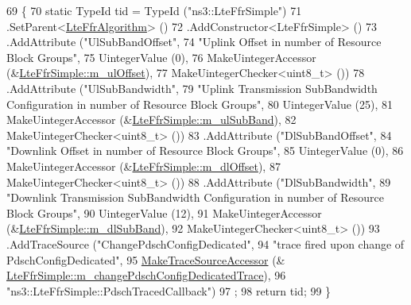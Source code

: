 \begin{DoxyCode}
69 \{
70   \textcolor{keyword}{static} TypeId tid = TypeId (\textcolor{stringliteral}{"ns3::LteFfrSimple"})
71     .SetParent<\hyperlink{classns3_1_1LteFfrAlgorithm_a1cfb2b0c9339553d90bf3eee7b66b25f}{LteFfrAlgorithm}> ()
72     .AddConstructor<LteFfrSimple> ()
73     .AddAttribute (\textcolor{stringliteral}{"UlSubBandOffset"},
74                    \textcolor{stringliteral}{"Uplink Offset in number of Resource Block Groups"},
75                    UintegerValue (0),
76                    MakeUintegerAccessor (&\hyperlink{classns3_1_1LteFfrSimple_aecad2931c0699de2c4df244e937dbea5}{LteFfrSimple::m\_ulOffset}),
77                    MakeUintegerChecker<uint8\_t> ())
78     .AddAttribute (\textcolor{stringliteral}{"UlSubBandwidth"},
79                    \textcolor{stringliteral}{"Uplink Transmission SubBandwidth Configuration in number of Resource Block Groups"},
80                    UintegerValue (25),
81                    MakeUintegerAccessor (&\hyperlink{classns3_1_1LteFfrSimple_aaa17d1f4400375af086fcf3df4250bc6}{LteFfrSimple::m\_ulSubBand}),
82                    MakeUintegerChecker<uint8\_t> ())
83     .AddAttribute (\textcolor{stringliteral}{"DlSubBandOffset"},
84                    \textcolor{stringliteral}{"Downlink Offset in number of Resource Block Groups"},
85                    UintegerValue (0),
86                    MakeUintegerAccessor (&\hyperlink{classns3_1_1LteFfrSimple_a60e29441b8323b122a1dce4fce2bb1a0}{LteFfrSimple::m\_dlOffset}),
87                    MakeUintegerChecker<uint8\_t> ())
88     .AddAttribute (\textcolor{stringliteral}{"DlSubBandwidth"},
89                    \textcolor{stringliteral}{"Downlink Transmission SubBandwidth Configuration in number of Resource Block Groups"},
90                    UintegerValue (12),
91                    MakeUintegerAccessor (&\hyperlink{classns3_1_1LteFfrSimple_a4f071c341b36e2dc634d556be7dec056}{LteFfrSimple::m\_dlSubBand}),
92                    MakeUintegerChecker<uint8\_t> ())
93     .AddTraceSource (\textcolor{stringliteral}{"ChangePdschConfigDedicated"},
94                      \textcolor{stringliteral}{"trace fired upon change of PdschConfigDedicated"},
95                      \hyperlink{group__tracing_gab21a770b9855af4e8f69f7531ea4a6b0}{MakeTraceSourceAccessor} (&
      \hyperlink{classns3_1_1LteFfrSimple_ae9c3c4775a8ed9296cb56f2011e6a31a}{LteFfrSimple::m\_changePdschConfigDedicatedTrace}),
96                      \textcolor{stringliteral}{"ns3::LteFfrSimple::PdschTracedCallback"})
97   ;
98   \textcolor{keywordflow}{return} tid;
99 \}
\end{DoxyCode}


